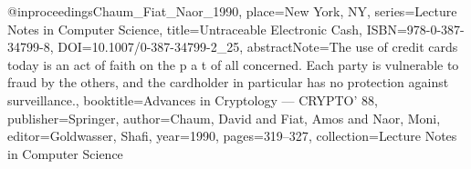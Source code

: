  @inproceedings{Chaum_Fiat_Naor_1990, place={New York, NY}, series={Lecture Notes in Computer Science}, title={Untraceable Electronic Cash}, ISBN={978-0-387-34799-8}, DOI={10.1007/0-387-34799-2_25}, abstractNote={The use of credit cards today is an act of faith on the p a t of all concerned. Each party is vulnerable to fraud by the others, and the cardholder in particular has no protection against surveillance.}, booktitle={Advances in Cryptology — CRYPTO’ 88}, publisher={Springer}, author={Chaum, David and Fiat, Amos and Naor, Moni}, editor={Goldwasser, Shafi}, year={1990}, pages={319–327}, collection={Lecture Notes in Computer Science} }
